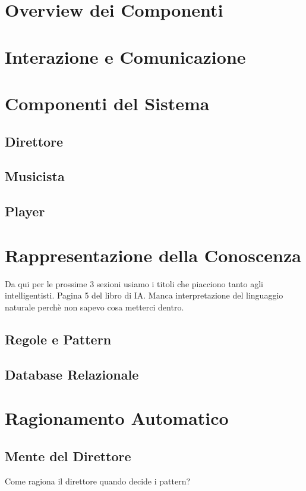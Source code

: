 \documentclass[a4paper,10pt]{article}
\begin{document}
\section{Overview dei Componenti}

\section{Interazione e Comunicazione}

\section{Componenti del Sistema}
\subsection{Direttore}

\subsection{Musicista}

\subsection{Player}


\section{Rappresentazione della Conoscenza}
Da qui per le prossime 3 sezioni usiamo i titoli che piacciono tanto 
agli intelligentisti. Pagina 5 del libro di IA. 
Manca interpretazione del linguaggio naturale perchè non sapevo cosa metterci dentro.
\subsection{Regole e Pattern}
\subsection{Database Relazionale}

\section{Ragionamento Automatico}
\subsection{Mente del Direttore}
Come ragiona il direttore quando decide i pattern?
\end{document}
